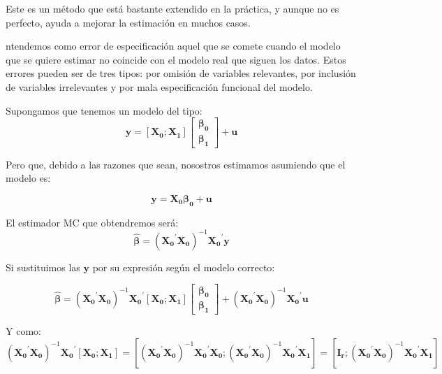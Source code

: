 Este es un m\'etodo que est\'a bastante extendido en la pr\'actica, y aunque no es perfecto, ayuda a mejorar la estimaci\'on en muchos casos.



ntendemos como error de especificaci\'on aquel que se comete cuando el modelo que se quiere estimar no coincide con el modelo real que siguen los datos. Estos errores pueden ser de tres tipos: por omisi\'on de variables relevantes, por inclusi\'on de variables irrelevantes y por mala especificaci\'on funcional del modelo.


Supongamos que tenemos un modelo del tipo:
\[\boldsymbol{y}=\left[\boldsymbol{X_0}; \boldsymbol{X_1}\right]\left[\begin{matrix}
\boldsymbol{\beta_0} \\
\boldsymbol{\beta_1}
\end{matrix}\right]+\boldsymbol{u} \]

Pero que, debido a las razones que sean, nosostros estimamos asumiendo que el modelo es:

\[ \boldsymbol{y}=\boldsymbol{X_0}\boldsymbol{\beta_0}+\boldsymbol{u} \]

El estimador MC que obtendremos ser\'a:
\[\hat{\boldsymbol{\beta}}=\left(\boldsymbol{X_0}^{\prime}\boldsymbol{X_0}\right)^{-1}\boldsymbol{X_0}^{\prime}\boldsymbol{y}\] 

Si sustituimos las $\boldsymbol{y}$ por su expresi\'on seg\'un el modelo correcto:

\[\hat{\boldsymbol{\beta}}=\left(\boldsymbol{X_0}^{\prime}\boldsymbol{X_0}\right)^{-1}\boldsymbol{X_0}^{\prime}\left[\boldsymbol{X_0}; \boldsymbol{X_1}\right]\left[\begin{matrix}
\boldsymbol{\beta_0} \\
\boldsymbol{\beta_1}
\end{matrix}\right]+\left(\boldsymbol{X_0}^{\prime}\boldsymbol{X_0}\right)^{-1}\boldsymbol{X_0}^{\prime}\boldsymbol{u}\]

Y como:
\[\left(\boldsymbol{X_0}^{\prime}\boldsymbol{X_0}\right)^{-1}\boldsymbol{X_0}^{\prime}\left[\boldsymbol{X_0}; \boldsymbol{X_1}\right]=\left[\left(\boldsymbol{X_0}^{\prime}\boldsymbol{X_0}\right)^{-1}\boldsymbol{X_0}^{\prime}\boldsymbol{X_0};\left(\boldsymbol{X_0}^{\prime}\boldsymbol{X_0}\right)^{-1}\boldsymbol{X_0}^{\prime}\boldsymbol{X_1}\right]=\left[\boldsymbol{I_r};\left(\boldsymbol{X_0}^{\prime}\boldsymbol{X_0}\right)^{-1}\boldsymbol{X_0}^{\prime}\boldsymbol{X_1}\right]\]

